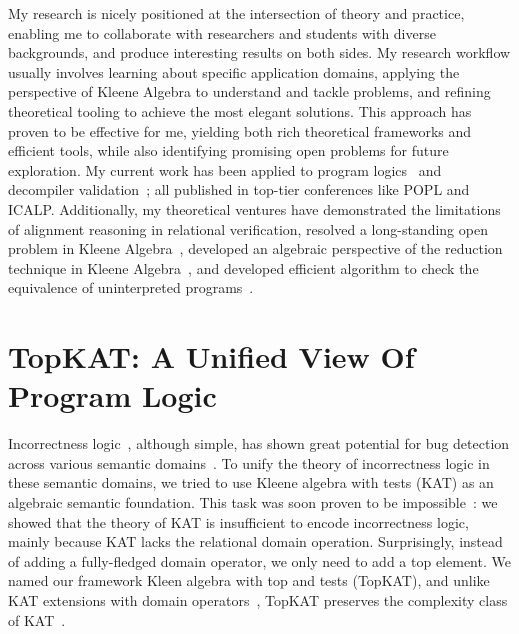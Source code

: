 \documentclass[11pt,a4paper,sans]{moderncv} %
\begin{document}
My research is nicely positioned at the intersection of theory and practice, enabling me to collaborate with researchers and students with diverse backgrounds, and produce interesting results on both sides. 
My research workflow usually involves learning about specific application domains, applying the perspective of Kleene Algebra to understand and tackle problems, and refining theoretical tooling to achieve the most elegant solutions. 
This approach has proven to be effective for me, yielding both rich theoretical frameworks and efficient tools, while also identifying promising open problems for future exploration. 
My current work has been applied to program logics~\cite{zhang_IncorrectnessLogicKleene_2022,zhang_DomainReasoningTopKAT_2024} and decompiler validation~\cite{zhang_CFGKATEfficientValidation_2025}; all published in top-tier conferences like POPL and ICALP. 
Additionally, my theoretical ventures have demonstrated the limitations of alignment reasoning in relational verification, resolved a long-standing open problem in Kleene Algebra~\cite{azevedodeamorim_KleeneAlgebraCommutativity_2024a}, developed an algebraic perspective of the reduction technique in Kleene Algebra~\cite{zhang_DomainReasoningTopKAT_2024}, and developed efficient algorithm to check the equivalence of uninterpreted programs~\cite{zhang_EfficientSymbolicAlgorithms_2025}.


\section{TopKAT: A Unified View Of Program Logic}

Incorrectness logic~\cite{ohearn_IncorrectnessLogic_2020}, although simple, has shown great potential for bug detection across various semantic domains~\cite{raad_LocalReasoningPresence_2020,le_FindingRealBugs_2022, zhang_QuantitativeStrongestPost_2022b}.
To unify the theory of incorrectness logic in these semantic domains, we tried to use Kleene algebra with tests (KAT) as an algebraic semantic foundation. 
This task was soon proven to be impossible~\cite{zhang_IncorrectnessLogicKleene_2022}: we showed that the theory of KAT is insufficient to encode incorrectness logic, mainly because KAT lacks the relational domain operation.
Surprisingly, instead of adding a fully-fledged domain operator, we only need to add a top element.
We named our framework Kleen algebra with top and tests (TopKAT), and unlike KAT extensions with domain operators~\cite{desharnais_KleeneAlgebraDomain_2006,sedlar_ComplexityKleeneAlgebra_2023}, TopKAT preserves the complexity class of KAT~\cite{zhang_IncorrectnessLogicKleene_2022}.
\end{document}
